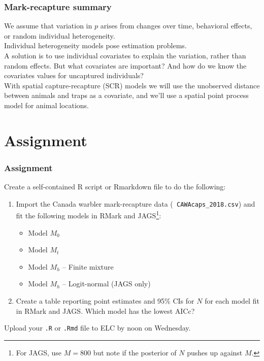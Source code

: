 \documentclass[color=usenames,dvipsnames]{beamer}\usepackage[]{graphicx}\usepackage[]{xcolor}
\begin{document}


\begin{frame}
  \frametitle{Mark-recapture summary}
  We assume that variation in $p$ arises from changes over time,
  behavioral effects, or random individual heterogeneity. \\
  \pause \vfill
  Individual heterogeneity models pose estimation problems. \\
  \pause \vfill
  A solution is to use individual covariates to explain the variation,
  rather than random effects. \pause But what covariates are
  important? And how do we know the covariates values for uncaptured
  individuals? \\
  \pause \vfill
  With spatial capture-recapture (SCR) models we will use
  \alert{the unobserved distance between animals and traps} as a
  covariate, and we'll use a spatial point process model for
  animal locations.  
\end{frame}




\section{Assignment}




\begin{frame}[fragile]
  \frametitle{Assignment}
  \small
  Create a self-contained R script or Rmarkdown file to do the
  following: 
  \vfill
  \begin{enumerate}
    \small
    \item Import the Canada warbler mark-recapture data ({\tt
        CAWAcaps\_2018.csv}) and fit the following models in RMark and
      JAGS\footnote{For JAGS, use $M=800$ but note if the posterior of
      $N$ pushes up against $M$.}:
      \begin{itemize}
        \item Model $M_0$
        \item Model $M_t$ 
        \item Model $M_h$ -- Finite mixture
        \item Model $M_h$ -- Logit-normal (JAGS only)
      \end{itemize}
    \item Create a table reporting point estimates and 95\% CIs for
      $N$ for each model fit in RMark and JAGS. Which model has the
      lowest AICc? 
  \end{enumerate}
  \vfill
  Upload your {\tt .R} or {\tt .Rmd} file to ELC by noon on Wednesday.
\end{frame}
\end{document}
